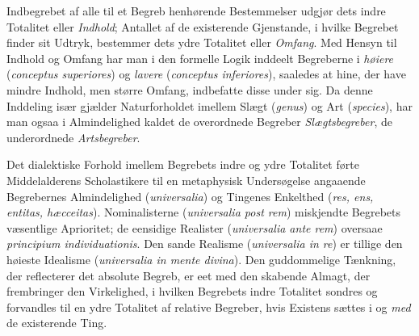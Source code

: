 \documentclass[12pt]{book}
\newcommand{\opage}[1]{\marginnote{\footnotesize\textit{[#1]}}}
\begin{document}
Indbegrebet af alle til et Begreb henhørende Bestemmelser udgjør dets indre
Totalitet eller \emph{Indhold}; Antallet af de existerende Gjenstande, i hvilke
Begrebet
\opage{27} finder sit Udtryk, bestemmer dets ydre Totalitet eller \emph{Omfang}. Med
Hensyn til Indhold og Omfang har man i den formelle Logik inddeelt Begreberne
i \emph{høiere} (\textit{conceptus superiores}) og \emph{lavere}
(\textit{conceptus inferiores}), saaledes at hine, der have mindre Indhold,
men større Omfang, indbefatte disse under sig. Da denne Inddeling især gjælder
Naturforholdet imellem Slægt (\textit{genus}) og Art (\textit{species}), har
man ogsaa i Almindelighed kaldet de overordnede Begreber
\emph{Slægtsbegreber}, de underordnede \emph{Artsbegreber}.

Det dialektiske Forhold imellem Begrebets indre og ydre Totalitet førte
Middelalderens Scholastikere til en metaphysisk Undersøgelse angaaende
Begrebernes Almindelighed (\textit{universalia}) og Tingenes Enkelthed
(\textit{res, ens, entitas, hæcceitas}). Nominalisterne (\textit{universalia
post rem}) miskjendte Begrebets væsentlige Aprioritet; de eensidige Realister
(\textit{universalia ante rem}) oversaae \textit{principium individuationis}.
Den sande Realisme (\textit{universalia in re}) er tillige den høieste
Idealisme (\textit{universalia in mente divina}). Den guddommelige Tænkning,
der reflecterer det absolute Begreb, er eet med den skabende Almagt, der
frembringer den Virkelighed, i hvilken Begrebets indre Totalitet sondres og
forvandles til en ydre Totalitet af relative Begreber, hvis Existens sættes i
og \emph{med} de existerende Ting.
\end{document}
